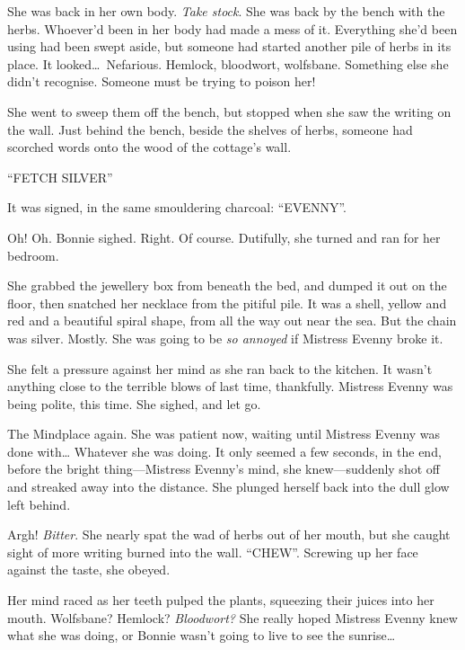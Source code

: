
She was back in her own body.
\emph{Take stock}.
She was back by the bench with the herbs.
Whoever'd been in her body had made a mess of it.
Everything she'd been using had been swept aside, but someone had started another pile of herbs in its place.
It looked{\dots}\ Nefarious.
Hemlock, bloodwort, wolfsbane.
Something else she didn't recognise.
Someone must be trying to poison her!

She went to sweep them off the bench, but stopped when she saw the writing on the wall.
Just behind the bench, beside the shelves of herbs, someone had scorched words onto the wood of the cottage's wall.

``FETCH SILVER''

It was signed, in the same smouldering charcoal: ``EVENNY''.

Oh!
Oh.
Bonnie sighed.
Right.
Of course.
Dutifully, she turned and ran for her bedroom.

She grabbed the jewellery box from beneath the bed, and dumped it out on the floor, then snatched her necklace from the pitiful pile.
It was a shell, yellow and red and a beautiful spiral shape, from all the way out near the sea.
But the chain was silver.
Mostly.
She was going to be \emph{so annoyed} if Mistress Evenny broke it.

She felt a pressure against her mind as she ran back to the kitchen.
It wasn't anything close to the terrible blows of last time, thankfully.
Mistress Evenny was being polite, this time.
She sighed, and let go.


The Mindplace again.
She was patient now, waiting until Mistress Evenny was done with{\dots} Whatever she was doing.
It only seemed a few seconds, in the end, before the bright thing---Mistress Evenny's mind, she knew---suddenly shot off and streaked away into the distance.
She plunged herself back into the dull glow left behind.


Argh!
\emph{Bitter}.
She nearly spat the wad of herbs out of her mouth, but she caught sight of more writing burned into the wall.
``CHEW''.
Screwing up her face against the taste, she obeyed.

Her mind raced as her teeth pulped the plants, squeezing their juices into her mouth.
Wolfsbane?
Hemlock?
\emph{Bloodwort?}
She really hoped Mistress Evenny knew what she was doing, or Bonnie wasn't going to live to see the sunrise{\dots}

